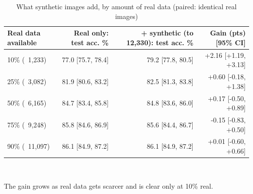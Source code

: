 \begin{table}[t]
\centering
\footnotesize
\caption{What synthetic images add, by amount of real data (paired: identical real images)}
\label{tab:t07_value_of_synthetic}
\begin{tabular}{lrrr}
\toprule
Real data available & Real only: test acc. \% & + synthetic (to 12,330): test acc. \% & Gain (pts) [95\% CI] \\
\midrule
10\% (~1,233) & 77.0 [75.7, 78.4] & 79.2 [77.8, 80.5] & +2.16 [+1.19, +3.13] \\
25\% (~3,082) & 81.9 [80.6, 83.2] & 82.5 [81.3, 83.8] & +0.60 [-0.18, +1.38] \\
50\% (~6,165) & 84.7 [83.4, 85.8] & 84.8 [83.6, 86.0] & +0.17 [-0.50, +0.89] \\
75\% (~9,248) & 85.8 [84.6, 86.9] & 85.6 [84.4, 86.7] & -0.15 [-0.83, +0.50] \\
90\% (~11,097) & 86.1 [84.9, 87.2] & 86.1 [84.9, 87.2] & +0.01 [-0.60, +0.66] \\
\bottomrule
\end{tabular}
\\[2pt]\parbox{\linewidth}{\scriptsize The gain grows as real data gets scarcer and is clear only at 10\% real.}
\end{table}
